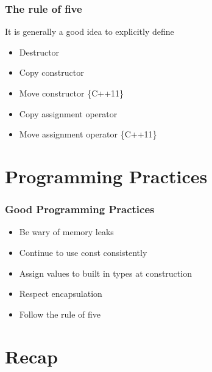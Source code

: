 \documentclass[14pt,a4paper,dvipsnames,usenames]{beamer}
\begin{document}
\begin{frame}
  \frametitle{The rule of %
   five}

  It is generally a good idea to explicitly define

  \vspace{.5em}
  \begin{itemize}
    \setlength\itemsep{.5em}
    \item Destructor
    \item Copy constructor
    \item Move constructor {\footnotesize\color{Tropiteal}\{C++11\}}
    \item Copy assignment operator
    \item Move assignment operator {\footnotesize\color{Tropiteal}\{C++11\}}
  \end{itemize}
  
\end{frame}

\section{Programming Practices}

\frame[plain]{\sectionpage}

\begin{frame}
  \frametitle{Good Programming Practices}

  \begin{itemize}
    \setlength\itemsep{0.5em}
    \item Be wary of memory leaks
    \item Continue to use {\color{FeebleWeek}const} consistently
    \item Assign values to built in types at construction
    \item Respect encapsulation
    \item Follow the rule of five
  \end{itemize}
  
\end{frame}


\section{Recap}

\frame[plain]{\sectionpage}
\end{document}

